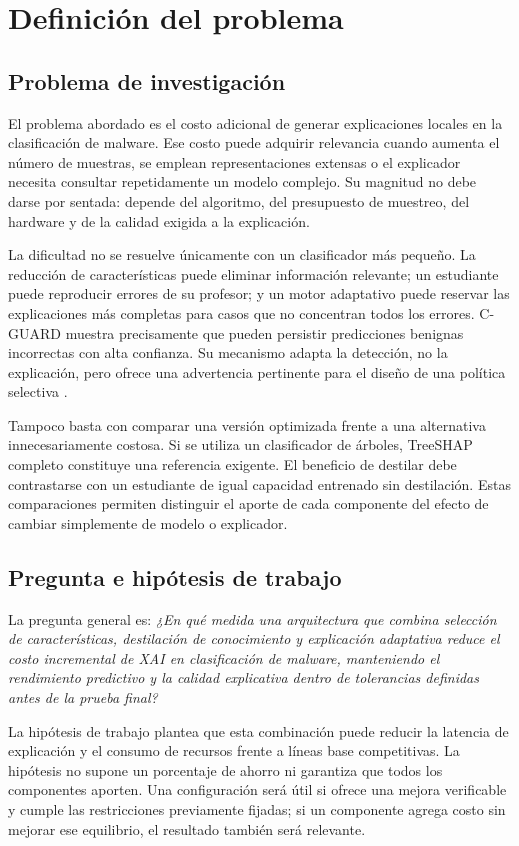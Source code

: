 \chapter{Definición del problema}
\section{Problema de investigación}
El problema abordado es el costo adicional de generar explicaciones locales en la clasificación de malware. Ese costo puede adquirir relevancia cuando aumenta el número de muestras, se emplean representaciones extensas o el explicador necesita consultar repetidamente un modelo complejo. Su magnitud no debe darse por sentada: depende del algoritmo, del presupuesto de muestreo, del hardware y de la calidad exigida a la explicación.

La dificultad no se resuelve únicamente con un clasificador más pequeño. La reducción de características puede eliminar información relevante; un estudiante puede reproducir errores de su profesor; y un motor adaptativo puede reservar las explicaciones más completas para casos que no concentran todos los errores. C-GUARD muestra precisamente que pueden persistir predicciones benignas incorrectas con alta confianza. Su mecanismo adapta la detección, no la explicación, pero ofrece una advertencia pertinente para el diseño de una política selectiva \parencite{Imran2026CGUARD}.

Tampoco basta con comparar una versión optimizada frente a una alternativa innecesariamente costosa. Si se utiliza un clasificador de árboles, TreeSHAP completo constituye una referencia exigente. El beneficio de destilar debe contrastarse con un estudiante de igual capacidad entrenado sin destilación. Estas comparaciones permiten distinguir el aporte de cada componente del efecto de cambiar simplemente de modelo o explicador.

\section{Pregunta e hipótesis de trabajo}
La pregunta general es: \textit{¿En qué medida una arquitectura que combina selección de características, destilación de conocimiento y explicación adaptativa reduce el costo incremental de XAI en clasificación de malware, manteniendo el rendimiento predictivo y la calidad explicativa dentro de tolerancias definidas antes de la prueba final?}

La hipótesis de trabajo plantea que esta combinación puede reducir la latencia de explicación y el consumo de recursos frente a líneas base competitivas. La hipótesis no supone un porcentaje de ahorro ni garantiza que todos los componentes aporten. Una configuración será útil si ofrece una mejora verificable y cumple las restricciones previamente fijadas; si un componente agrega costo sin mejorar ese equilibrio, el resultado también será relevante.

